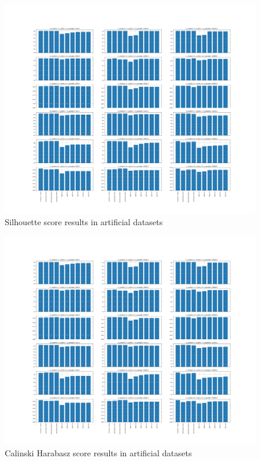 \begin{figure}[!ht]
    \includegraphics[width=\linewidth]{images/additional_experiments/silouette_score.png}
    \caption{Silhouette score results in artificial datasets}
    \label{fig:silhouette}
\end{figure}

\begin{figure}[!ht]
    \includegraphics[width=\linewidth]{images/additional_experiments/silouette_score.png}
    \caption{Calinski Harabasz score results in artificial datasets}
    \label{fig:calinski_harabasz_score}
\end{figure}


